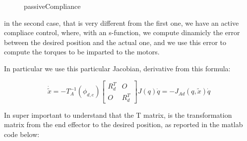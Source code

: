 \documentclass{article}
\begin{document}
\begin{figure}[H]
    \centering
    \caption{passiveCompliance}
    \label{fig:passiveCompliance}
\end{figure}








in the second case, that is very different from the first one, we have an active compliace control, where, with an s-function, we compute dinamicly the error between the desired position and the actual one, and we use this error to compute the torques to be imparted to the motors.

In particular we use this particular Jacobian, derivative from this formula:

\begin{equation}
    \dot{\tilde{x}} = -T_A^{-1}(\phi_{d,e}) \begin{bmatrix} R_d^T & O \\ O & R_d^T \end{bmatrix} J(q) \dot{q} = -J_{Ad}(q, \tilde{x}) \dot{q}
\end{equation}

In super important to understand that the T matrix, is the transformation matrix from the end effector to the desired position, as reported in the matlab code below:
\end{document}
